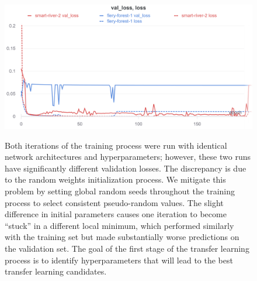 \begin{figure}
    \centering
    \includegraphics[width=\linewidth]{Chapters/Figures/best-params-meta1.png}
    \label{fig:meta-1-best}
    \caption[Hyperpamater Sweep 2]{Both iterations of the training process were run with identical network architectures and hyperparameters; however, these two runs have significantly different validation losses. The discrepancy is due to the random weights initialization process. We mitigate this problem by setting global random seeds throughout the training process to select consistent pseudo-random values. The slight difference in initial parameters causes one iteration to become ``stuck'' in a different local minimum, which performed similarly with the training set but made substantially worse predictions on the validation set. The goal of the first stage of the transfer learning process is to identify hyperparameters that will lead to the best transfer learning candidates.}
\end{figure}

